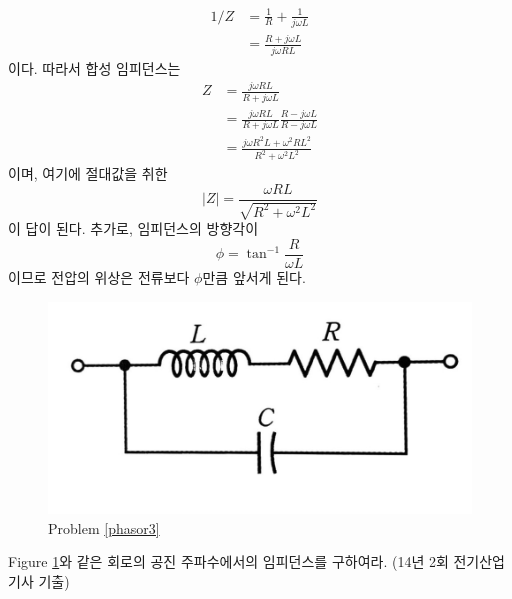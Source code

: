 \begin{align}
1/Z&=\frac{1}{R}+\frac{1}{j\omega L}\\
&= \frac{R+j\omega L}{j\omega RL}
\end{align}
이다. 따라서 합성 임피던스는 
\begin{align}
Z&=\frac{j\omega RL}{R+j\omega L}\\
&=\frac{j\omega RL}{R+j\omega L}\frac{R-j\omega L}{R-j\omega L}\\
&= \frac{j\omega R^2 L + \omega ^2 RL^2}{R^2+\omega^2L^2}
\end{align}
이며, 여기에 절대값을 취한
\begin{equation}
|Z|=\frac{\omega R L}{\sqrt{ R^2 +\omega ^2 L^2}}
\end{equation}
이 답이 된다. 추가로, 임피던스의 방향각이
\begin{equation}
\phi = \tan^{-1}\frac{R}{\omega L}
\end{equation}
이므로 전압의 위상은 전류보다 $\phi$만큼 앞서게 된다.
\begin{figure}[h]
\centering\includegraphics[scale=0.15]{Pictures/phasor3.jpg}
\caption{Problem \ref{phasor3}}
\label{fig:phasor3}
\end{figure}
\begin{exercise}\label{phasor3}
Figure \ref{fig:phasor3}와 같은 회로의 공진 주파수에서의 임피던스를 구하여라.
(14년 2회 전기산업기사 기출)
\end{exercise}

